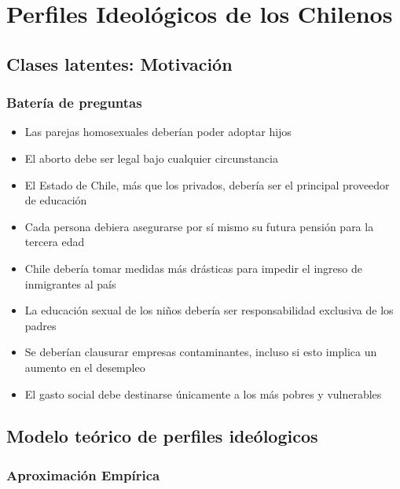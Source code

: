 \documentclass[
  12pt,
]{book}
\providecommand{\tightlist}{%
  \setlength{\itemsep}{0pt}\setlength{\parskip}{0pt}}
\begin{document}
\hypertarget{perfiles-ideoluxf3gicos-de-los-chilenos}{%
\chapter{Perfiles Ideológicos de los Chilenos}\label{perfiles-ideoluxf3gicos-de-los-chilenos}}

\hypertarget{clases-latentes-motivaciuxf3n}{%
\section{Clases latentes: Motivación}\label{clases-latentes-motivaciuxf3n}}

\hypertarget{bateruxeda-de-preguntas}{%
\subsection{Batería de preguntas}\label{bateruxeda-de-preguntas}}

\begin{itemize}
\tightlist
\item
  Las parejas homosexuales deberían poder adoptar hijos
\item
  El aborto debe ser legal bajo cualquier circunstancia
\item
  El Estado de Chile, más que los privados, debería ser el principal proveedor de educación
\item
  Cada persona debiera asegurarse por sí mismo su futura pensión para la tercera edad
\item
  Chile debería tomar medidas más drásticas para impedir el ingreso de inmigrantes al país
\item
  La educación sexual de los niños debería ser responsabilidad exclusiva de los padres
\item
  Se deberían clausurar empresas contaminantes, incluso si esto implica un aumento en el desempleo
\item
  El gasto social debe destinarse únicamente a los más pobres y vulnerables
\end{itemize}

\hypertarget{modelo-teuxf3rico-de-perfiles-ideuxf3logicos}{%
\section{Modelo teórico de perfiles ideólogicos}\label{modelo-teuxf3rico-de-perfiles-ideuxf3logicos}}

\hypertarget{aproximaciuxf3n-empuxedrica}{%
\subsection{Aproximación Empírica}\label{aproximaciuxf3n-empuxedrica}}
\end{document}
